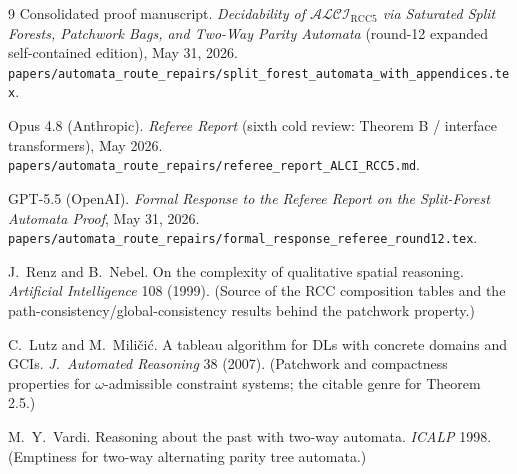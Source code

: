 \documentclass[11pt]{article}
\theoremstyle{definition}
\newcommand{\code}[1]{\texttt{#1}}
\begin{document}
\begin{thebibliography}{9}
 Consolidated proof manuscript.
\emph{Decidability of $\mathcal{ALCI}_{\mathrm{RCC5}}$ via Saturated Split
Forests, Patchwork Bags, and Two-Way Parity Automata} (round-12 expanded
self-contained edition), May 31, 2026.
\code{papers/automata\_route\_repairs/split\_forest\_automata\_with\_appendices.tex}.

 Opus 4.8 (Anthropic).  \emph{Referee Report} (sixth cold
review: Theorem B / interface transformers), May 2026.
\code{papers/automata\_route\_repairs/referee\_report\_ALCI\_RCC5.md}.

 GPT-5.5 (OpenAI).  \emph{Formal Response to the Referee
Report on the Split-Forest Automata Proof}, May 31, 2026.
\code{papers/automata\_route\_repairs/formal\_response\_referee\_round12.tex}.

 J.~Renz and B.~Nebel.  On the complexity of qualitative
spatial reasoning.  \emph{Artificial Intelligence} 108 (1999).  (Source of
the RCC composition tables and the path-consistency/global-consistency
results behind the patchwork property.)

 C.~Lutz and M.~Mili\v{c}i\'c.  A tableau algorithm for
DLs with concrete domains and GCIs.  \emph{J.~Automated Reasoning} 38
(2007).  (Patchwork and compactness properties for $\omega$-admissible
constraint systems; the citable genre for Theorem 2.5.)

 M.~Y.~Vardi.  Reasoning about the past with two-way
automata.  \emph{ICALP} 1998.  (Emptiness for two-way alternating parity
tree automata.)
\end{thebibliography}
\end{document}
